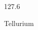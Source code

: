 \documentclass[12pt]{article}
\begin{document}
\hfill{}
\vfill
\begin{center}
  {\fontsize{50}{60}
  }

  \vspace{1em}

  127.6

Tellurium
\end{center}
\vfill
\end{document}
